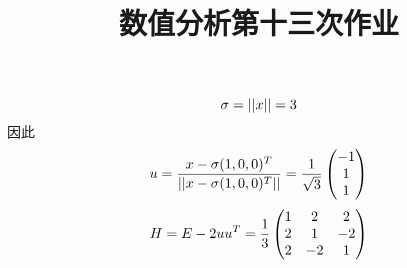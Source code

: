 \documentclass[UTF8]{ctexart}
\title{数值分析第十三次作业}
\begin{document}
 
\maketitle
{}
$$\sigma = ||x|| = 3$$
因此$$u=\frac{x-\sigma(1,0,0)^T}{||x-\sigma(1,0,0)^T||} = \frac{1}{\sqrt{3}}\begin{pmatrix} -1\\1\\1\end{pmatrix}$$
    $$H=E-2uu^T = \frac{1}{3}\begin{pmatrix}1&2&2\\2&1&-2\\2&-2&1 \end{pmatrix}$$
\end{document}
